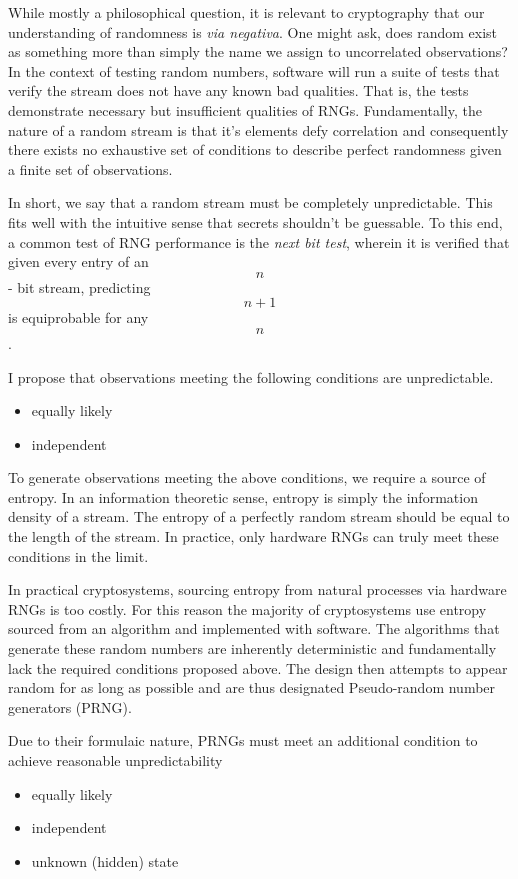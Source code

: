 \documentclass[conference]{/Users/paul/MSEE/ee595/project/report/IEEEtran/IEEEtran}
\begin{document}
    While mostly a philosophical question, it is relevant to cryptography that our understanding of randomness is \textit{via negativa}. One might ask, does random exist as something more than simply the name we assign to uncorrelated observations? In the context of testing random numbers, software will run a suite of tests that verify the stream does not have any known bad qualities. That is, the tests demonstrate necessary but insufficient qualities of RNGs. Fundamentally, the nature of a random stream is that it's elements defy correlation and consequently there exists no exhaustive set of conditions to describe perfect randomness given a finite set of observations. 
 
    In short, we say that a random stream must be completely unpredictable. This fits well with the intuitive sense that secrets shouldn't be guessable. To this end, a common test of RNG performance is the \textit{next bit test}, wherein it is verified that given every entry of an $$n$$ - bit stream, predicting $$n + 1$$ is equiprobable for any $$n$$. 
 
I propose that observations meeting the following conditions are unpredictable.
  
\begin{itemize}
    \item equally likely 
    \item independent
\end{itemize}
 
To generate observations meeting the above conditions, we require a source of entropy. In an information theoretic sense, entropy is simply the information density of a stream. The entropy of a perfectly random stream should be equal to the length of the stream. In practice, only hardware RNGs can truly meet these conditions in the limit. 
 
In practical cryptosystems, sourcing entropy from natural processes via hardware RNGs is too costly. For this reason the majority of cryptosystems use entropy sourced from an algorithm and implemented with software. The algorithms that generate these random numbers are inherently deterministic and fundamentally lack the required conditions proposed above. The design then attempts to appear random for as long as possible and are thus designated Pseudo-random number generators (PRNG). 
 
Due to their formulaic nature, PRNGs must meet an additional condition to achieve 
reasonable unpredictability
 
\begin{itemize}
    \item equally likely 
    \item independent
    \item unknown (hidden) state
\end{itemize}
\end{document}
